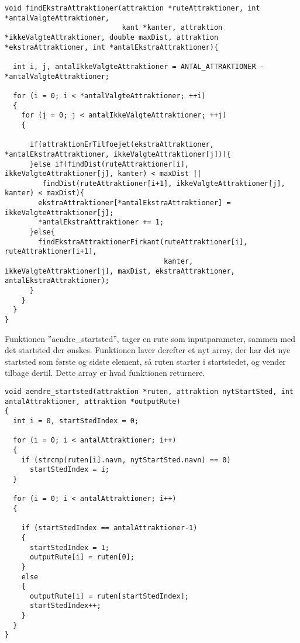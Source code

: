 \begin{lstlisting}
void findEkstraAttraktioner(attraktion *ruteAttraktioner, int *antalValgteAttraktioner, 
                            kant *kanter, attraktion *ikkeValgteAttraktioner, double maxDist, attraktion *ekstraAttraktioner, int *antalEkstraAttraktioner){

  int i, j, antalIkkeValgteAttraktioner = ANTAL_ATTRAKTIONER - *antalValgteAttraktioner;

  for (i = 0; i < *antalValgteAttraktioner; ++i)
  {
    for (j = 0; j < antalIkkeValgteAttraktioner; ++j)
    {

      if(attraktionErTilfoejet(ekstraAttraktioner, *antalEkstraAttraktioner, ikkeValgteAttraktioner[j])){
      }else if(findDist(ruteAttraktioner[i], ikkeValgteAttraktioner[j], kanter) < maxDist || 
         findDist(ruteAttraktioner[i+1], ikkeValgteAttraktioner[j], kanter) < maxDist){
        ekstraAttraktioner[*antalEkstraAttraktioner] = ikkeValgteAttraktioner[j];
        *antalEkstraAttraktioner += 1;
      }else{
        findEkstraAttraktionerFirkant(ruteAttraktioner[i], ruteAttraktioner[i+1], 
                                      kanter, ikkeValgteAttraktioner[j], maxDist, ekstraAttraktioner, antalEkstraAttraktioner);
      }
    }
  }
}
\end{lstlisting}

Funktionen ”aendre\_startsted”, tager en rute som inputparameter, sammen med det startsted der ønskes. Funktionen laver derefter et nyt array, der har det nye startsted som første og sidste element, så ruten starter i startstedet, og vender tilbage dertil. Dette array er hvad funktionen returnere.  \newline

\begin{lstlisting}
void aendre_startsted(attraktion *ruten, attraktion nytStartSted, int antalAttraktioner, attraktion *outputRute)
{
  int i = 0, startStedIndex = 0;

  for (i = 0; i < antalAttraktioner; i++)
  {
    if (strcmp(ruten[i].navn, nytStartSted.navn) == 0)
      startStedIndex = i;
  }

  for (i = 0; i < antalAttraktioner; i++)
  {

    if (startStedIndex == antalAttraktioner-1)
    {
      startStedIndex = 1;
      outputRute[i] = ruten[0];
    }
    else
    {
      outputRute[i] = ruten[startStedIndex];
      startStedIndex++;
    }
  }
}
\end{lstlisting}

